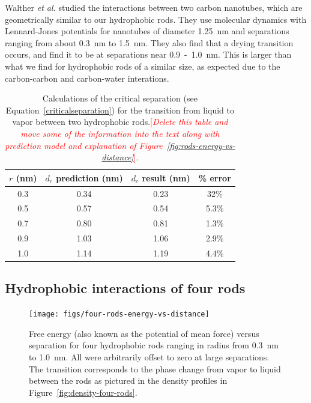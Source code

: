 \documentclass[letterpaper,twocolumn,amsmath,amssymb,prb]{revtex4-1}
\newcommand{\needsworknow}[1]{\textcolor{red}{[\emph{#1}]}}
\begin{document}
Walther \emph{et al.}\cite{walther2004hydrodynamic} studied the interactions between two
carbon nanotubes, which are geometrically similar to our hydrophobic rods. 
They use molecular dynamics with Lennard-Jones potentials for
nanotubes of diameter 1.25~nm and separations ranging from about 0.3~nm to 1.5~nm.
They also find that a drying transition occurs, and find it to be at separations near
0.9~-~1.0~nm\cite{walther2004hydrodynamic}. This is larger than
what we find for hydrophobic rods of a similar size, as expected due to the carbon-carbon
and carbon-water interations. 

\begin{table}
\begin{tabular} {|c|c|c|c|}
\hline
$r$ (nm) & $d_c$ prediction (nm) & $d_c$ result (nm) & \% error \\
\hline
0.3 & 0.34 & 0.23 & 32\% \\
\hline
0.5 & 0.57 & 0.54 & 5.3\% \\
\hline
0.7 & 0.80 & 0.81 & 1.3\% \\
\hline
0.9 & 1.03 & 1.06 & 2.9\% \\
\hline
1.0 & 1.14 & 1.19 & 4.4\% \\
\hline
\end{tabular}
\caption{Calculations of the critical separation 
(see Equation~\ref{criticalseparation})
for the transition
from liquid to vapor between two hydrophobic rods.\needsworknow{Delete
this table and move some of the information into the text along with
prediction model and explanation of Figure~\ref{fig:rods-energy-vs-distance}}.}
\label{criticalseparationtable}
\end{table} 

\subsection{Hydrophobic interactions of four rods}

\begin{figure}
\begin{center}
\texttt{[image: figs/four-rods-energy-vs-distance]}
\end{center}
\caption{ Free energy (also known as the potential of mean force) 
versus separation for four hydrophobic rods ranging in radius from
0.3~nm to 1.0~nm.
All were arbitrarily offset to zero at large separations. The
transition corresponds to the phase change from
vapor to liquid between the rods as pictured in the density profiles in 
Figure~\ref{fig:density-four-rods}. }
\label{fig:four-rods-energy-vs-distance}
\end{figure}
\end{document}
